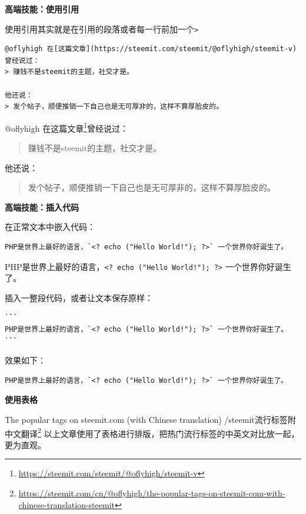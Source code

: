 \documentclass[]{ctexbook}
\renewcommand{\href}[2]{#2\footnote{\url{#1}}}
\begin{document}
\textbf{高端技能：使用引用}

使用引用其实就是在引用的段落或者每一行前加一个\texttt{\textgreater{}}

\begin{verbatim}
@oflyhigh 在[这篇文章](https://steemit.com/steemit/@oflyhigh/steemit-v)曾经说过：
> 赚钱不是steemit的主题，社交才是。

他还说：
> 发个帖子，顺便推销一下自己也是无可厚非的，这样不算厚脸皮的。
\end{verbatim}

@oflyhigh 在\href{https://steemit.com/steemit/@oflyhigh/steemit-v}{这篇文章}曾经说过：

\begin{quote}
赚钱不是steemit的主题，社交才是。
\end{quote}

他还说：

\begin{quote}
发个帖子，顺便推销一下自己也是无可厚非的，这样不算厚脸皮的。
\end{quote}

\textbf{高端技能：插入代码}

在正常文本中嵌入代码：

\begin{verbatim}
PHP是世界上最好的语言，`<? echo ("Hello World!"); ?>` 一个世界你好诞生了。
\end{verbatim}

PHP是世界上最好的语言，\texttt{\textless{}?\ echo\ ("Hello\ World!");\ ?\textgreater{}} 一个世界你好诞生了。

插入一整段代码，或者让文本保存原样：

\begin{verbatim}
```
PHP是世界上最好的语言，`<? echo ("Hello World!"); ?>` 一个世界你好诞生了。
```
\end{verbatim}

效果如下：

\begin{verbatim}
PHP是世界上最好的语言，`<? echo ("Hello World!"); ?>` 一个世界你好诞生了。
\end{verbatim}

\textbf{使用表格}

\href{https://steemit.com/cn/@oflyhigh/the-popular-tags-on-steemit-com-with-chinese-translation-steemit}{The popular tags on steemit.com (with Chinese translation) /steemit流行标签附中文翻译}
以上文章使用了表格进行排版，把热门流行标签的中英文对比放一起，更为直观。
\end{document}
